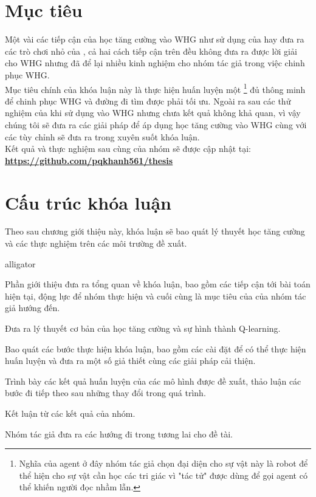 \section{Mục tiêu}
Một vài các tiếp cận của học tăng cường vào WHG như sử dụng của \cite{WHG_codebullet} hay đưa ra các trò chơi nhỏ của \cite{WHG_yasyf}, cả hai cách tiếp cận trên đều không đưa ra được lời giải cho WHG nhưng đã để lại nhiều kinh nghiệm cho nhóm tác giả trong việc chinh phục WHG.\\
Mục tiêu chính của khóa luận này là thực hiện huấn luyện một \footnote{Nghĩa của agent ở đây nhóm tác giả chọn đại diện cho sự vật này là robot để thể hiện cho sự vật cần học các tri giác vì "tác tử" được dùng để gọi agent có thể khiến người đọc nhầm lẫn.} đủ thông minh để chinh phục WHG và đường đi tìm được phải tối ưu. Ngoài ra sau các thử nghiệm của \cite{WHG_yasyf} khi sử dụng vào WHG nhưng chưa kết quả không khả quan, vì vậy chúng tôi sẽ đưa ra các giải pháp để áp dụng học tăng cường vào WHG cùng với các tùy chỉnh sẽ đưa ra trong xuyên suốt khóa luận.\\
Kết quả và thực nghiệm sau cùng của nhóm sẽ được cập nhật tại:\\
\textbf{\href{https://github.com/pqkhanh561/thesis}{https://github.com/pqkhanh561/thesis}}

\section{Cấu trúc khóa luận}
Theo sau chương giới thiệu này, khóa luận sẽ bao quát lý thuyết học tăng cường và các thực nghiệm trên các môi trường đề xuất.
\begin{labeling}{alligator}
\item [\textbf{Chương 1:}] Phần giới thiệu đưa ra tổng quan về khóa luận, bao gồm các tiếp cận tới bài toán hiện tại, động lực để nhóm thực hiện và cuối cùng là mục tiêu của của nhóm tác giả hướng đến.
\item [\textbf{Chương 2:}] Đưa ra lý thuyết cơ bản của học tăng cường và sự hình thành Q-learning.
\item [\textbf{Chương 3:}] Bao quát các bước thực hiện khóa luận, bao gồm các cài đặt để có thể thực hiện huấn luyện và đưa ra một số giả thiết cùng các giải pháp cải thiện.
\item [\textbf{Chương 4:}] Trình bày các kết quả huấn luyện của các mô hình được đề xuất, thảo luận các bước đi tiếp theo sau những thay đổi trong quá trình.
\item [\textbf{Chương 5:}] Kết luận từ các kết quả của nhóm.
\item [\textbf{Chương 6:}] Nhóm tác giả đưa ra các hướng đi trong tương lai cho đề tài.
\end{labeling}
